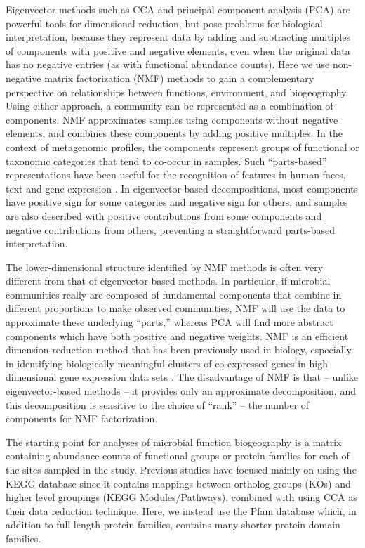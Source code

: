 Eigenvector methods such as CCA and principal component analysis (PCA) are powerful tools for dimensional reduction, but pose problems for biological interpretation, because they represent data by adding and subtracting multiples of components with positive and negative elements, even when the original data has no negative entries (as with functional abundance counts).  Here we use non-negative matrix factorization (NMF) \cite{lee_learning_1999} methods to gain a complementary perspective on relationships between functions, environment, and biogeography.  Using either approach, a community can be represented as a combination of components.  NMF approximates samples using components without negative elements, and combines these components by adding positive multiples. In the context of metagenomic profiles, the components represent groups of functional or taxonomic categories that tend to co-occur in samples. Such ``parts-based'' representations have been useful for the recognition of features in human faces, text and gene expression \cite{lee_learning_1999, brunet_metagenes_2004}. In eigenvector-based decompositions, most components have positive sign for some categories and negative sign for others, and samples are also described with positive contributions from some components and negative contributions from others, preventing a straightforward parts-based interpretation.

The lower-dimensional structure identified by NMF methods is often very different from that of eigenvector-based methods. In particular, if microbial communities really are composed of fundamental components that combine in different proportions to make observed communities, NMF will use the data to approximate these underlying ``parts,'' whereas PCA will find more abstract components which have both positive and negative weights.  NMF is an efficient dimension-reduction method that has been previously used in biology, especially in identifying biologically meaningful clusters of co-expressed genes in high dimensional gene expression data sets \cite{kim_subsystem_2003, brunet_metagenes_2004, devarajan_nonnegative_2008}.  The disadvantage of NMF is that -- unlike eigenvector-based methods -- it provides only an approximate decomposition, and this decomposition is sensitive to the choice of ``rank'' -- the number of components for NMF factorization.

The starting point for analyses of microbial function biogeography is a matrix containing abundance counts of functional groups or protein families for each of the sites sampled in the study. Previous studies have focused mainly on using the KEGG \cite{kanehisa_kegg_2010} database since it contains mappings between ortholog groups (KOs) and higher level groupings (KEGG Modules/Pathways), combined with using CCA as their data reduction technique.  Here, we instead use the Pfam database \cite{finn_pfam_2010} which, in addition to full length protein families, contains many shorter protein domain families.

